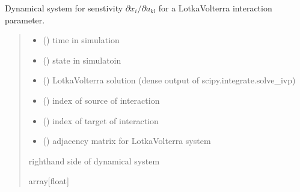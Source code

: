 \documentclass[letterpaper,10pt,english]{sphinxmanual}
\begin{document}
\begin{fulllineitems}
\label{\detokenize{sensit:sensitivity.sense_kl}}
\pysigstartsignatures
{}
\pysigstopsignatures
\sphinxAtStartPar
Dynamical system for senstivity \(\partial x_i/\partial a_{kl}\) for a Lotka\sphinxhyphen{}Volterra interaction parameter.
\begin{quote}\begin{description}
\begin{itemize}
\item {} 
\sphinxAtStartPar
{} () \textendash{} time in simulation

\item {} 
\sphinxAtStartPar
{} (\sphinxstyleliteralemphasis{\sphinxupquote{{[}}}\sphinxstyleliteralemphasis{\sphinxupquote{{]}}}) \textendash{} state in simulatoin

\item {} 
\sphinxAtStartPar
{} () \textendash{} Lotka\sphinxhyphen{}Volterra solution (dense output of scipy.integrate.solve\_ivp)

\item {} 
\sphinxAtStartPar
{} () \textendash{} index of source of interaction

\item {} 
\sphinxAtStartPar
{} () \textendash{} index of target of interaction

\item {} 
\sphinxAtStartPar
{} (\sphinxstyleliteralemphasis{\sphinxupquote{{[}}}\sphinxstyleliteralemphasis{\sphinxupquote{{]}}}) \textendash{} adjacency matrix for Lotka\sphinxhyphen{}Volterra system

\end{itemize}

\sphinxAtStartPar
right\sphinxhyphen{}hand side of dynamical system

\sphinxAtStartPar
array{[}float{]}

\end{description}\end{quote}

\end{fulllineitems}
\end{document}
